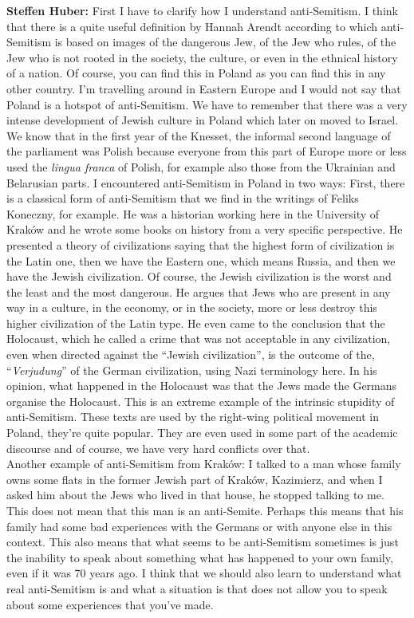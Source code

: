 \textbf{Steffen Huber:} First I have to clarify how I understand anti-Semitism. I think that there is a quite useful definition by Hannah Arendt according to which anti-Semitism is based on images of the dangerous Jew, of the Jew who rules, of the Jew who is not rooted in the society, the culture, or even in the ethnical history of a nation. Of course, you can find this in Poland as you can find this in any other country. I'm travelling around in Eastern Europe and I would not say that Poland is a hotspot of anti-Semitism. We have to remember that there was a very intense development of Jewish culture in Poland which later on moved to Israel. We know that in the first year of the Knesset, the informal second language of the parliament was Polish because everyone from this part of Europe more or less used the \textit{lingua franca} of Polish, for example also those from the Ukrainian and Belarusian parts. I encountered anti-Semitism in Poland in two ways: First, there is a classical form of anti-Semitism that we find in the writings of Feliks Koneczny, for example. He was a historian working here in the University of Kraków and he wrote some books on history from a very specific perspective. He presented a theory of civilizations saying that the highest form of civilization is the Latin one, then we have the Eastern one, which means Russia, and then we have the Jewish civilization. Of course, the Jewish civilization is the worst and the least and the most dangerous. He argues that Jews who are present in any way in a culture, in the economy, or in the society, more or less destroy this higher civilization of the Latin type. He even came to the conclusion that the Holocaust, which he called a crime that was not acceptable in any civilization, even when directed against the ``Jewish civilization'', is the outcome of the, ``\textit{Verjudung}'' of the German civilization, using Nazi terminology here. In his opinion, what happened in the Holocaust was that the Jews made the Germans organise the Holocaust. This is an extreme example of the intrinsic stupidity of anti-Semitism. These texts are used by the right-wing political movement in Poland, they're quite popular. They are even used in some part of the academic discourse and of course, we have very hard conflicts over that.\\
Another example of anti-Semitism from Kraków: I talked to a man whose family owns some flats in the former Jewish part of Kraków, Kazimierz, and when I asked him about the Jews who lived in that house, he stopped talking to me. This does not mean that this man is an anti-Semite. Perhaps this means that his family had some bad experiences with the Germans or with anyone else in this context. This also means that what seems to be anti-Semitism sometimes is just the inability to speak about something what has happened to your own family, even if it was 70 years ago. I think that we should also learn to understand what real anti-Semitism is and what a situation is that does not allow you to speak about some experiences that you’ve made. 


